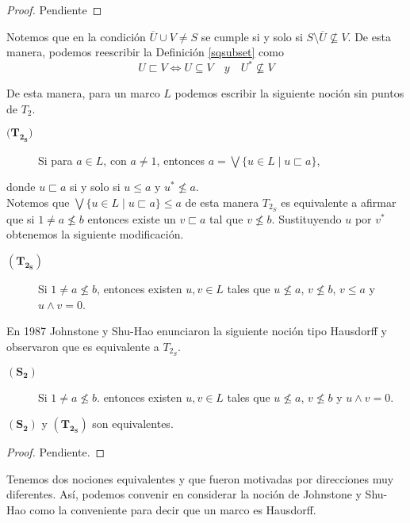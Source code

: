 \begin{proof}
    Pendiente
\end{proof}

Notemos que en la condición $\overline{U}\cup V\neq S$ se cumple si y solo si $S\setminus \overline{U}\nsubseteq V$. De esta manera, podemos reescribir la Definición \ref{sqsubset} como 
\[
U\sqsubset V\Leftrightarrow U\subseteq V\quad{ y }\quad U^*\nsubseteq V
\]

De esta manera, para un marco $L$ podemos escribir la siguiente noción sin puntos de $T_2$.
\begin{description}
    \item[$\mathbf{(T_{2_S}})$] Si para $a\in L$, con $a\neq 1$, entonces $a=\bigvee\{u\in L\mid u\sqsubset a\}$, 
\end{description}
donde $u\sqsubset a$ si y solo si $u\leq a$ y $u^*\nleq a$.\\

Notemos que $\bigvee\{u\in L\mid u\sqsubset a\}\leq a$ de esta manera $T_{2_S}$ es equivalente a afirmar que si $1\neq a\nleq b$ entonces existe un $v\sqsubset a$ tal que $v\nleq b$. Sustituyendo $u$ por $v^*$ obtenemos la siguiente modificación.

\begin{description}
    \item[$\mathbf{(T_{2_S})}$] Si $1\neq a\nleq b$, entonces existen $u, v\in L$ tales que $u\nleq a$, $v\nleq b$, $v\leq a$ y $u\wedge v=0$. 
\end{description}

En 1987 Johnstone y Shu-Hao enunciaron la siguiente noción tipo Hausdorff y observaron que es equivalente a $T_{2_S}$.

\begin{description}
    \item[$\mathbf{(S_2)}$] Si $1\neq a\nleq b$. entonces existen $u, v\in L$ tales que $u\nleq a$, $v\nleq b$ y $u\wedge v=0$. 
\end{description}

\begin{prop}\label{Proposicion3.3.1}
    $\mathbf{(S_2)}$ y $\mathbf{(T_{2_S})}$ son equivalentes.
\end{prop}

\begin{proof}
    Pendiente.
\end{proof}

Tenemos dos nociones equivalentes y que fueron motivadas por direcciones muy diferentes. Así, podemos convenir en considerar la noción de Johnstone y Shu-Hao como la conveniente para decir que un marco es Hausdorff.

